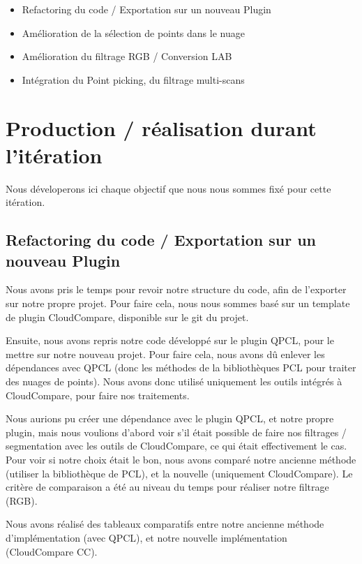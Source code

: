 \documentclass[12pt,titlepage,french]{article}
\begin{document}
\begin{itemize}
  \item Refactoring du code / Exportation sur un nouveau Plugin
  \item Amélioration de la sélection de points dans le nuage
  \item Amélioration du filtrage RGB / Conversion LAB
  \item Intégration du Point picking, du filtrage multi-scans
\end{itemize}

\section{Production / réalisation durant l'itération}

Nous déveloperons ici chaque objectif que nous nous sommes fixé pour cette itération.

\subsection{Refactoring du code / Exportation sur un nouveau Plugin}

Nous avons pris le temps pour revoir notre structure du code, afin de l'exporter sur notre propre projet. Pour faire cela, nous nous sommes basé sur un template de plugin CloudCompare, disponible sur le git du projet. \newline

Ensuite, nous avons repris notre code développé sur le plugin QPCL, pour le mettre sur notre nouveau projet. Pour faire cela, nous avons dû enlever les dépendances avec QPCL (donc les méthodes de la bibliothèques PCL pour traiter des nuages de points). Nous avons donc utilisé uniquement les outils intégrés à CloudCompare, pour faire nos traitements. \newline

Nous aurions pu créer une dépendance avec le plugin QPCL, et notre propre plugin, mais nous voulions d'abord voir s'il était possible de faire nos filtrages / segmentation avec les outils de CloudCompare, ce qui était effectivement le cas. Pour voir si notre choix était le bon, nous avons comparé notre ancienne méthode (utiliser la bibliothèque de PCL), et la nouvelle (uniquement CloudCompare). Le critère de comparaison a été au niveau du temps pour réaliser notre filtrage (RGB). \newline

Nous avons réalisé des tableaux comparatifs entre notre ancienne méthode d'implémentation (avec QPCL), et notre nouvelle implémentation (CloudCompare CC). \newline
\end{document}
